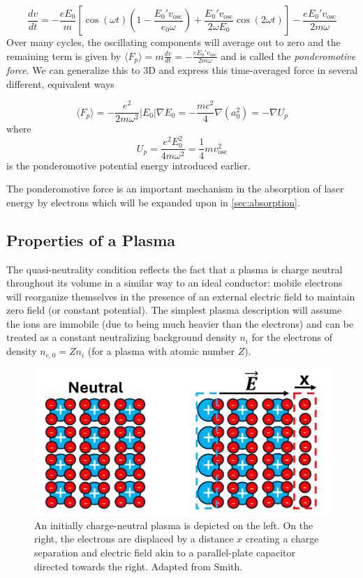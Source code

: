 \begin{equation}
	\frac{d v}{d t} = - \frac{e E_0}{m} [\cos(\omega t)(1 - \frac{E_0' v_\text{osc}}{e_0 \omega}) + \frac{E_0' v_\text{osc}}{2 \omega E_0} \cos(2 \omega t)] - \frac{e E_0' v_\text{osc}}{2 m \omega}
\end{equation}
Over many cycles, the oscillating components will average out to zero and the remaining term is given by $\langle F_p \rangle = m \frac{d v}{d t} = - \frac{e E_0' v_\text{osc}}{2 m \omega}$ and is called the \emph{ponderomotive force}. We can generalize this to 3D and express this time-averaged force in several different, equivalent ways

\begin{equation}
	\langle F_p \rangle = - \frac{e^2}{2 m \omega^2} \lvert E_0 \rvert \nabla E_0 = - \frac{m c^2}{4} \nabla(a_0^2) = - \nabla U_p \label{eq:pond_force}
\end{equation}
where 
\begin{equation}
	U_p = \frac{e^2 E_0^2}{4 m \omega^2} = \frac{1}{4} m v_\text{osc}^2 \label{eq:pond_potential}
\end{equation}
is the ponderomotive potential energy introduced earlier. 

The ponderomotive force is an important mechanism in the absorption of laser energy by electrons which will be expanded upon in \cref{sec:absorption}.

\subsection{Properties of a Plasma}
The quasi-neutrality condition reflects the fact that a plasma is charge neutral throughout its volume in a similar way to an ideal conductor: mobile electrons will reorganize themselves in the presence of an external electric field to maintain zero field (or constant  potential). The simplest plasma description will assume the ions are immobile (due to being much heavier than the electrons) and can be treated as a constant neutralizing background density $n_i$ for the electrons of density $n_{e,0} = Z n_i$ (for a plasma with atomic number $Z$).

\begin{figure}
	\centering
	\includegraphics[width=0.75\linewidth]{planning/images/plasma_oscillation.PNG}
	\caption{An initially charge-neutral plasma is depicted on the left. On the right, the electrons are displaced by a distance $x$ creating a charge separation and electric field akin to a parallel-plate capacitor directed towards the right. Adapted from Smith\cite{Smith_2020_Thesis}.}
	\label{fig:plasma_oscillation}
\end{figure}

